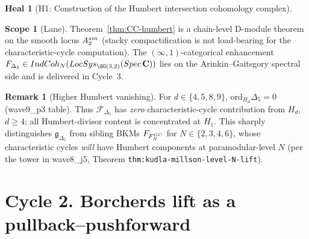 \documentclass[11pt]{amsart}
\theoremstyle{definition}
\newtheorem{heal}[attack]{Heal}
\newtheorem{scope}[theorem]{Scope}
\newtheorem{remark}{Remark}
\providecommand{\IndCoh}{\mathrm{IndCoh}}
\providecommand{\LocSys}{\mathrm{LocSys}}
\providecommand{\cF}{\mathcal{F}}
\providecommand{\bC}{\mathbf{C}}
\providecommand{\Dfive}{\Delta_5}
\providecommand{\gDfive}{\mathfrak{g}_{\Dfive}}
\begin{document}
\begin{heal}[H1: Construction of the Humbert intersection
cohomology complex]
\begin{scope}[Lane]\label{scope:lane-H1}
Theorem~\ref{thm:CC-humbert} is a chain-level D-module theorem on the
smooth locus $\mathcal{A}_2^{\rm sm}$ (stacky compactification is not
load-bearing for the characteristic-cycle computation).
The $(\infty,1)$-categorical enhancement
$\cF_{\Dfive} \in \IndCoh_{\cN}(\LocSys_{\SO(3,2)}(\mathrm{Spec}\,\bC))$
lies on the Arinkin--Gaitsgory spectral side and is delivered in Cycle~3.
\end{scope}

\begin{remark}[Higher Humbert vanishing]
For $d \in \{4, 5, 8, 9\}$, $\mathrm{ord}_{H_d}\Dfive = 0$ (wave9\_p3
table). Thus $\cF_{\Dfive}$ has \emph{zero} characteristic-cycle
contribution from $H_d$, $d \geq 4$; all Humbert-divisor content is
concentrated at $H_1$. This sharply distinguishes $\gDfive$ from
sibling BKMs $\cF_{F^{\rm GC}_N}$ for $N \in \{2,3,4,6\}$, whose
characteristic cycles \emph{will} have Humbert components at
paramodular-level $N$ (per the tower in wave8\_j5, Theorem
\texttt{thm:kudla-millson-level-N-lift}).
\end{remark}
\end{heal}

\section{Cycle 2. Borcherds lift as a pullback--pushforward}
\end{document}
